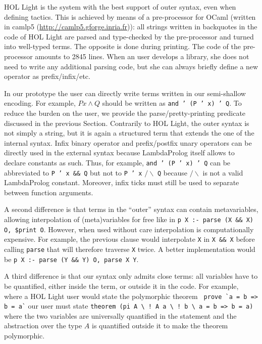 \documentclass[preprint]{sigplanconf}
\begin{document}
HOL Light is the system with the best support of outer syntax, even when defining tactics. This is achieved by means of a pre-processor for OCaml (written in camlp5 (\url{http://camlp5.gforge.inria.fr})): all strings written in backquotes in the code of HOL Light are parsed and type-checked by the pre-processor and turned into well-typed terms. The opposite is done during printing. The code of the pre-processor amounts to 2845 lines. When an user develops a library, she does not need to write any additional parsing code, but she can always briefly define a new operator as prefix/infix/etc.

In our prototype the user can directly write terms written in our semi-shallow encoding. For example, $P x \wedge Q$ should be written as \texttt{and ' (P ' x) ' Q}. To reduce the burden on the user, we provide the parse/pretty-printing predicate discussed in the previous Section. Contrarily to HOL Light, the outer syntax is not simply a string, but it is again a structured term that extends the one of the internal syntax. Infix binary operator and prefix/postfix unary operators can be directly used in the external syntax because LambdaProlog itself allows to declare constants as such. Thus, for example, \texttt{and ' (P ' x) ' Q} can be abbreviated to \texttt{P ' x \&\& Q} but not to \texttt{P ' x} $/\backslash$ \texttt{Q} because $/\backslash$ is not a valid LambdaProlog constant. Moreover, infix ticks must still be used to separate between function arguments.

A second difference  is that terms in the ``outer'' syntax can contain metavariables, allowing interpolation of (meta)variables for free like in \texttt{p X :- parse (X \&\& X) O, \$print O}. However, when used without care interpolation is computationally expensive. For example, the previous clause would interpolate \verb+X+ in \verb+X && X+ before calling \verb+parse+ that will therefore traverse \verb+X+ twice. A better implementation would be \texttt{p X :- parse (Y \&\& Y) O, parse X Y}.

A third difference is that our syntax only admits close terms: all variables have to be quantified, either inside the term, or outside it in the code. For example, where a HOL Light user would state the polymorphic theorem \verb+ prove `a = b => b = a`+ our user must state \verb+theorem (pi A \ ! A a \ ! b \ a = b => b = a)+ where the two variables are universally quantified in the statement and the abstraction over the type $A$ is quantified outside it to make the theorem polymorphic.
\end{document}
